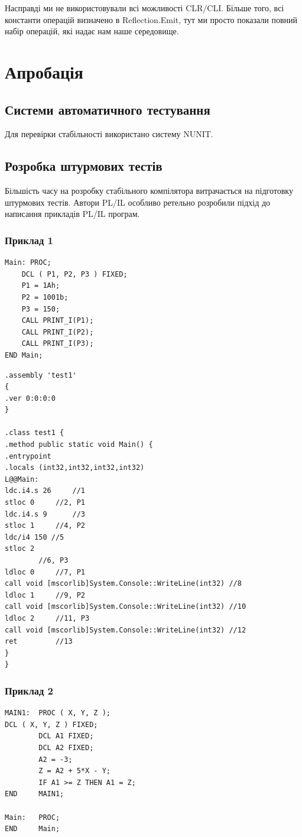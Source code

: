 \documentclass{memoir}
\begin{document}
Насправді ми не використовували всі можливості CLR/CLI. Більше того,
всі константи операцій визначено в Reflection.Emit, тут ми просто показали
повний набір операцій, які надає нам наше середовище.

\chapter{Апробація}
\section{Системи автоматичного тестування}
Для перевірки стабільності використано систему NUNIT.

\section{Розробка штурмових тестів}
Більшість часу на розробку стабільного компілятора витрачається на
підготовку штурмових тестів. Автори PL/IL особливо ретельно розробили
підхід до написання прикладів PL/IL програм.

\subsection{Приклад 1}

\begin{lstlisting}
Main: PROC;
    DCL ( P1, P2, P3 ) FIXED;
    P1 = 1Ah;
    P2 = 1001b;
    P3 = 150;
    CALL PRINT_I(P1);
    CALL PRINT_I(P2);
    CALL PRINT_I(P3);
END Main;
\end{lstlisting}

\begin{lstlisting}
.assembly 'test1'
{
.ver 0:0:0:0
}

.class test1 {
.method public static void Main() {
.entrypoint
.locals (int32,int32,int32,int32)
L@@Main:
ldc.i4.s 26 	//1
stloc 0		//2, P1
ldc.i4.s 9		//3
stloc 1		//4, P2
ldc/i4 150 //5
stloc 2
		//6, P3
ldloc 0		//7, P1
call void [mscorlib]System.Console::WriteLine(int32) //8
ldloc 1		//9, P2
call void [mscorlib]System.Console::WriteLine(int32) //10
ldloc 2		//11, P3
call void [mscorlib]System.Console::WriteLine(int32) //12
ret			//13
}
}
\end{lstlisting}

\subsection{Приклад 2}

\begin{lstlisting}
MAIN1:	PROC ( X, Y, Z );
DCL ( X, Y, Z ) FIXED;
    	DCL A1 FIXED;
    	DCL A2 FIXED;
		A2 = -3;
		Z = A2 + 5*X - Y;
    	IF A1 >= Z THEN A1 = Z;
END 	MAIN1;

Main: 	PROC;
END 	Main;
\end{lstlisting}
\end{document}
